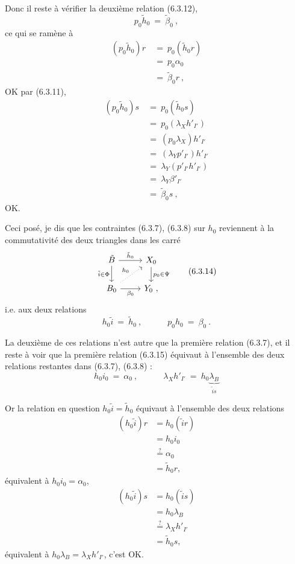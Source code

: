 \documentclass[11pt]{article}
\newcommand{\printedpage}[1]{\marginpar{\footnotesize p.~#1}}
\newcommand{\msp}[1]{\marginpar{\footnotesize [#1]}}
\begin{document}
Donc il reste à vérifier la deuxième relation (6.3.12),
\[
p_0\tilde{h}_0 \ =\ \tilde{\beta}_0\ ,
\]
ce qui se ramène à
\[
\begin{aligned}
(p_0\tilde{h}_0)r \ &=\ p_0(\tilde{h}_0r) \\
&=\ p_0\alpha_0 \\
&=\ \tilde{\beta}_0r\ ,
\end{aligned}
\]
OK par (6.3.11),
\[
\begin{aligned}
(p_0\tilde{h}_0)s \ &=\ p_0(\tilde{h}_0s) \\
&=\ p_0(\lambda_X h'_{I'}) \\
&=\ (p_0\lambda_X)h'_{I'} \\
&=\ (\lambda_Y p'_{I'})h'_{I'} \\
&=\ \lambda_Y(p'_{I'}h'_{I'}) \\
&=\ \lambda_Y\beta'_{I'} \\
&=\ \tilde{\beta}_0s\ ,
\end{aligned}
\]
OK.

Ceci posé, je dis que les contraintes (6.3.7), (6.3.8) sur $h_0$ reviennent à la commutativité des deux triangles dans les carré %
\[
\begin{tikzcd}
\tilde{B} \arrow[r, "\tilde{h}_0"] \arrow[d, "\tilde{i}\in\Phi"'] & X_0 \arrow[d, "p_0\in\Psi"] \\
B_0 \arrow[r, "\beta_0"'] \arrow[ur, dotted, "h_0"] & Y_0\ ,
\end{tikzcd}
\tag*{(6.3.14)}
\]
\msp{page 116}i.e. aux deux relations
\[
h_0\tilde{i} \ =\ \tilde{h}_0\ , \qquad\quad p_0h_0 \ =\ \beta_0\ .
\tag*{(6.3.15)}
\]

La deuxième de ces relations n'est autre que la première relation (6.3.7), et il reste à voir que la première relation (6.3.15) équivaut à l'ensemble des deux relations restantes dans (6.3.7), (6.3.8) :
\[
h_0i_0 \ =\ \alpha_0\ , \qquad\quad \lambda_X h'_{I'} \ =\ h_0\underbrace{\lambda_B}_{\tilde{i}s}
\tag*{(6.3.16)}
\]

\printedpage{59}

Or la relation en question $h_0\tilde{i} = \tilde{h}_0$ équivaut à l'ensemble des deux relations
\[
\begin{aligned}
(h_0\tilde{i})r &= h_0(\tilde{i}r)\\
&= h_0i_0\\
&\overset{?}{=} \alpha_0\\
&= \tilde{h}_0r,
\end{aligned}
\]
équivalent à $h_0i_0 = \alpha_0$,
\[
\begin{aligned}
(h_0\tilde{i})s &= h_0(\tilde{i}s)\\
&= h_0\lambda_B\\
&\overset{?}{=} \lambda_Xh'_{I'}\\
&= \tilde{h}_0s,
\end{aligned}
\]
équivalent à $h_0\lambda_B = \lambda_Xh'_{I'}$, c'est OK.
\end{document}
